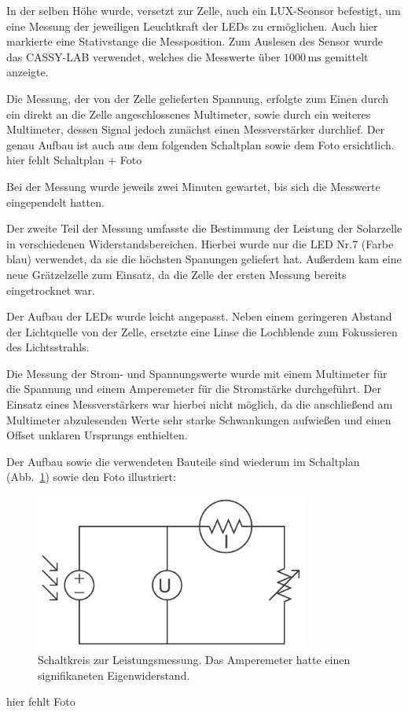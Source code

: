 \documentclass[11pt]{scrartcl}
\newcommand{\unit}[1]{\ensuremath{\,\mathrm{#1}}} %
\begin{document}
In der selben H\"ohe wurde, versetzt zur Zelle, auch ein LUX-Seonsor befestigt, um eine Messung der jeweiligen Leuchtkraft der LEDs zu erm\"oglichen. Auch hier markierte eine Stativstange die Messposition. Zum Auslesen des Sensor wurde das CASSY-LAB verwendet, welches die Messwerte \"uber $1000\unit{ms}$ gemittelt anzeigte.

Die Messung, der von der Zelle gelieferten Spannung, erfolgte zum Einen durch ein direkt an die Zelle angeschlossenes Multimeter, sowie durch ein weiteres Multimeter, dessen Signal jedoch zun\"achst einen Messverst\"arker durchlief. Der genau Aufbau ist auch aus dem folgenden Schaltplan sowie dem Foto ersichtlich.\newline
hier fehlt Schaltplan + Foto

Bei der Messung wurde jeweils zwei Minuten gewartet, bis sich die Messwerte eingependelt hatten.

Der zweite Teil der Messung umfasste die Bestimmung der Leistung der Solarzelle in verschiedenen Widerstandsbereichen. Hierbei wurde nur die LED Nr.7 (Farbe blau) verwendet, da sie die h\"ochsten Spanungen geliefert hat. Au\ss{}erdem kam eine neue Gr\"atzelzelle zum Einsatz, da die Zelle der ersten Messung bereits eingetrocknet war.

Der Aufbau der LEDs wurde leicht angepasst. Neben einem geringeren Abstand der Lichtquelle von der Zelle, ersetzte eine Linse die Lochblende zum Fokussieren des Lichtsstrahls.

Die Messung der Strom- und Spannungswerte wurde mit einem Multimeter f\"ur die Spannung und einem Amperemeter f\"ur die Stromst\"arke durchgef\"uhrt. Der Einsatz eines Messverst\"arkers war hierbei nicht m\"oglich, da die anschlie\ss{}end am Multimeter abzulesenden Werte sehr starke Schwankungen aufwie\ss{}en und einen Offset unklaren Ursprungs enthielten.

Der Aufbau sowie die verwendeten Bauteile sind wiederum im Schaltplan (Abb.~\ref{leistungsschaltkreis}) sowie den Foto illustriert:

\begin{figure}[ht]
\begin{center}
\includegraphics[width=0.8\textwidth]{images/leistungsmesskreis.pdf}
\end{center}
\vspace{-1.5\baselineskip}
\caption{Schaltkreis zur Leistungsmessung. Das Amperemeter hatte einen signifikaneten Eigenwiderstand.}
\label{leistungsschaltkreis}
\end{figure}
hier fehlt Foto
\end{document}
